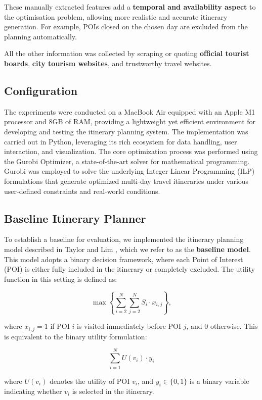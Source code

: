 These manually extracted features add a \textbf{temporal and availability aspect} to the optimisation problem, allowing more realistic and accurate itinerary generation. For example, POIs closed on the chosen day are excluded from the planning automatically.

All the other information was collected by scraping or quoting \textbf{official tourist boards}, \textbf{city tourism websites}, and trustworthy travel websites.

\subsection{Configuration}

The experiments were conducted on a MacBook Air equipped with an Apple M1 processor and 8GB of RAM, providing a lightweight yet efficient environment for developing and testing the itinerary planning system. The implementation was carried out in Python, leveraging its rich ecosystem for data handling, user interaction, and visualization. The core optimization process was performed using the Gurobi Optimizer, a state-of-the-art solver for mathematical programming. Gurobi was employed to solve the underlying Integer Linear Programming (ILP) formulations that generate optimized multi-day travel itineraries under various user-defined constraints and real-world conditions.

\subsection{Baseline Itinerary Planner}

To establish a baseline for evaluation, we implemented the itinerary planning model described in Taylor and Lim \cite{taylor2018tour}, which we refer to as the \textbf{baseline model}. This model adopts a binary decision framework, where each Point of Interest (POI) is either fully included in the itinerary or completely excluded. The utility function in this setting is defined as:

\[
\max \left\{ \sum_{i=2}^{N} \sum_{j=2}^{N} S_i \cdot x_{i,j} \right\},
\]

where \( x_{i,j} = 1 \) if POI \( i \) is visited immediately before POI \( j \), and 0 otherwise.  This is equivalent to the binary utility formulation:

\[
\sum_{i=1}^{N} U(v_i) \cdot y_i
\]

where \( U(v_i) \) denotes the utility of POI \( v_i \), and \( y_i \in \{0,1\} \) is a binary variable indicating whether \( v_i \) is selected in the itinerary.

